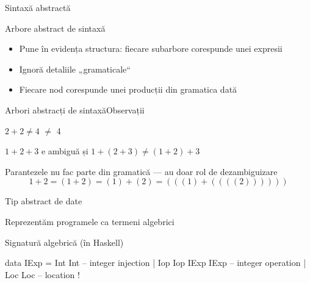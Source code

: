 \documentclass[xcolor=pdftex,romanian,colorlinks]{beamer}
\begin{document}
\begin{section}{Sintaxă abstractă}
\begin{frame}{Arbore abstract de sintaxă}
\begin{itemize}
\item Pune în evidența structura: fiecare subarbore corespunde unei expresii
\item Ignoră detaliile „gramaticale“
\item Fiecare nod corespunde unei producții din gramatica dată
\end{itemize}
\end{frame}

\begin{frame}{Arbori abstracți de sintaxă}{Observații}
\begin{block}{$2 + 2 \neq 4$}
\hfill
{}\hfill{\Large $\neq$}\hfill
4\hfill\;
\end{block}

\begin{block}{$1 + 2 + 3$ e ambiguă și $1 + (2 + 3) \neq (1 + 2) + 3$}
\hfill\begin{minipage}{.3\columnwidth}
\end{minipage}
\hfill
\begin{minipage}{.3\columnwidth}
\end{minipage}
\hfill\;
\end{block}

\begin{block}{Parantezele nu fac parte din gramatică --- au doar rol de dezambiguizare}
\[1 + 2 = (1 + 2) = (1) + (2) = (((1) + ((((2))))))\]
\end{block}
\end{frame}

\begin{subsection}{Tip abstract de date}

\begin{frame}[fragile]{}{Reprezentăm programele ca termeni algebrici}
\begin{block}{Signatură algebrică (în Haskell)}
\begin{asciihs}
  data IExp = Int Int                  -- integer injection
            | Iop Iop IExp IExp        -- integer operation 
            | Loc Loc                  -- location !


\end{asciihs}
\end{block}
\end{frame}
\end{subsection}
\end{section}
\end{document}
